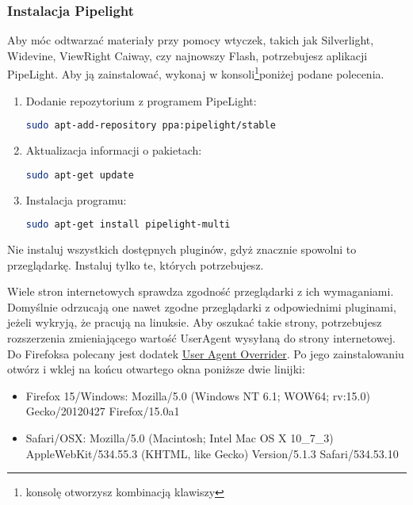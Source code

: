 \subsubsection{Instalacja Pipelight}
Aby móc odtwarzać materiały przy pomocy wtyczek, takich jak Silverlight, Widevine, ViewRight Caiway, czy najnowszy Flash, potrzebujesz aplikacji PipeLight. Aby ją zainstalować, wykonaj w konsoli\footnote{konsolę otworzysz kombinacją klawiszy }poniżej podane polecenia.
\begin{enumerate}
\item Dodanie repozytorium z programem PipeLight:
\begin{lstlisting}[language=bash]
sudo apt-add-repository ppa:pipelight/stable
\end{lstlisting}
\item Aktualizacja informacji o pakietach:
\begin{lstlisting}[language=bash]
sudo apt-get update
\end{lstlisting}
\item Instalacja programu:
\begin{lstlisting}[language=bash]
sudo apt-get install pipelight-multi
\end{lstlisting}
\end{enumerate}

\noindent Nie instaluj wszystkich dostępnych pluginów, gdyż znacznie spowolni to przeglądarkę. Instaluj tylko te, których potrzebujesz.

Wiele stron internetowych sprawdza zgodność przeglądarki z ich wymaganiami. Domyślnie odrzucają one nawet zgodne przeglądarki z odpowiednimi pluginami, jeżeli wykryją, że pracują na linuksie. Aby oszukać takie strony, potrzebujesz rozszerzenia zmieniającego wartość \textcolor{ubuntu_orange}{UserAgent} wysyłaną do strony internetowej. Do Firefoksa polecany jest dodatek \href{https://addons.mozilla.org/pl-PL/firefox/addon/user-agent-overrider/}{User Agent Overrider}. Po jego zainstalowaniu otwórz  i wklej na końcu otwartego okna poniższe dwie linijki:
\begin{itemize}
\item Firefox 15/Windows: Mozilla/5.0 (Windows NT 6.1; WOW64; rv:15.0) Gecko/20120427 Firefox/15.0a1
\item Safari/OSX: Mozilla/5.0 (Macintosh; Intel Mac OS X 10\_7\_3) AppleWebKit/534.55.3 (KHTML, like Gecko) Version/5.1.3 Safari/534.53.10
\end{itemize}

